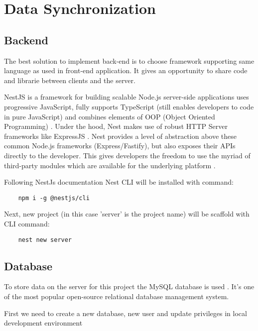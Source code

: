 \chapter{{Data Synchronization}}%
\label{ch:synchronisation}


\section{{Backend}}%
\label{sec:backend}
The best solution to implement back-end is to choose framework supporting same language as used in front-end application. It gives an opportunity to share code and librarie between clients and the server.

\begin{displayquote}
    NestJS is a framework for building scalable Node.js server-side applications uses progressive JavaScript,  fully supports TypeScript (still enables developers to code in pure JavaScript) and combines elements of OOP (Object Oriented Programming) \autocite{NyakundiOOP}. Under the hood, Nest makes use of robust HTTP Server frameworks like ExpressJS \autocite{ExpressJS}. 
    Nest provides a level of abstraction above these common Node.js frameworks (Express/Fastify), but also exposes their APIs directly to the developer. This gives developers the freedom to use the myriad of third-party modules which are available for the underlying platform \autocite{NestJsDoc}.
\end{displayquote}

Following NestJs documentation Nest CLI will be installed with command:
\begin{verbatim}
    npm i -g @nestjs/cli
\end{verbatim}

Next, new project (in this case 'server' is the project name) will be scaffold with CLI command:
\begin{verbatim}
    nest new server
\end{verbatim}



\section{{Database}}%
\label{sec:database}

To store data on the server for this project the MySQL database is used \autocite{MySQL}. It's one of the most popular open-source relational database management system.

First we need to create a new database, new user and update privileges in local development environment

